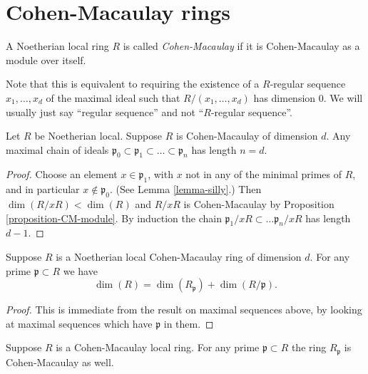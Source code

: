 \section{Cohen-Macaulay rings}
\label{section-CM-ring}

\begin{definition}
\label{definition-local-ring-CM}
A Noetherian local ring $R$ is called {\it Cohen-Macaulay}
if it is Cohen-Macaulay as a module over itself.
\end{definition}

\noindent
Note that this is equivalent to requiring the existence
of a $R$-regular sequence $x_1, \ldots, x_d$ of the maximal
ideal such that $R/(x_1, \ldots, x_d)$ has dimension $0$.
We will usually just say ``regular sequence'' and not
``$R$-regular sequence''.

\begin{lemma}
\label{lemma-maximal-chain-CM}
Let $R$ be Noetherian local.
Suppose $R$ is Cohen-Macaulay of dimension $d$.
Any maximal chain of ideals $\mathfrak p_0 \subset
\mathfrak p_1 \subset \ldots \subset \mathfrak p_n$
has length $n = d$.
\end{lemma}

\begin{proof}
Choose an element $x \in \mathfrak p_1$, with $x$ not in
any of the minimal primes of $R$, and in particular
$x \not \in \mathfrak p_0$. (See Lemma \ref{lemma-silly}.)
Then $\dim (R/xR) < \dim (R)$ and $R/xR$ is Cohen-Macaulay
by Proposition \ref{proposition-CM-module}. By induction
the chain $\mathfrak p_1/xR \subset \ldots \mathfrak p_n/xR$
has length $d - 1$.
\end{proof}

\begin{lemma}
\label{lemma-CM-dim-formula}
Suppose $R$ is a Noetherian local Cohen-Macaulay ring of dimension $d$.
For any prime $\mathfrak p \subset R$ we have
$$
\dim(R) = \dim(R_{\mathfrak p}) + \dim(R/\mathfrak p).
$$
\end{lemma}

\begin{proof}
This is immediate from the result on maximal sequences
above, by looking at maximal sequences which have $\mathfrak p$
in them.
\end{proof}

\begin{lemma}
\label{lemma-localize-CM}
Suppose $R$ is a Cohen-Macaulay local ring.
For any prime $\mathfrak p \subset R$ the
ring $R_{\mathfrak p}$ is Cohen-Macaulay as well.
\end{lemma}


